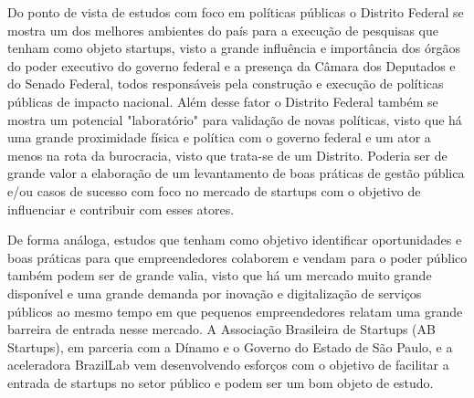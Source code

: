 Do ponto de vista de estudos com foco em políticas públicas o Distrito Federal se mostra um dos melhores ambientes do país para a execução de pesquisas que tenham como objeto startups, visto a grande influência e importância dos órgãos do poder executivo do governo federal e a presença da Câmara dos Deputados e do Senado Federal, todos responsáveis pela construção e execução de políticas públicas de impacto nacional. Além desse fator o Distrito Federal também se mostra um potencial "laboratório" para validação de novas políticas, visto que há uma grande proximidade física e política com o governo federal e um ator a menos na rota da burocracia, visto que trata-se de um Distrito. Poderia ser de grande valor a elaboração de um levantamento de boas práticas de gestão pública e/ou casos de sucesso com foco no mercado de startups com o objetivo de influenciar e contribuir com esses atores. 

De forma análoga, estudos que tenham como objetivo identificar oportunidades e boas práticas para que empreendedores colaborem e vendam para o poder público também podem ser de grande valia, visto que há um mercado muito grande disponível e uma grande demanda por inovação e digitalização de serviços públicos ao mesmo tempo em que pequenos empreendedores relatam uma grande barreira de entrada nesse mercado. A Associação Brasileira de Startups (AB Startups), em parceria com a Dínamo e o Governo do Estado de São Paulo, e a aceleradora BrazilLab vem desenvolvendo esforços com o objetivo de facilitar a entrada de startups no setor público e podem ser um bom objeto de estudo.